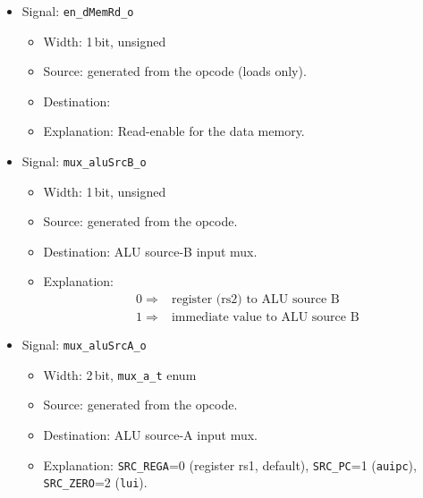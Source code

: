 \begin{itemize}
\begin{itemize}
    \item Width: 1\,bit, unsigned
    \item Source: generated from the opcode (stores only).
    \item Destination:  write enable.
    \item Explanation: Write-enable for the data memory.
  \end{itemize}
  \item Signal: \texttt{en\_dMemRd\_o}
  \begin{itemize}
    \item Width: 1\,bit, unsigned
    \item Source: generated from the opcode (loads only).
    \item Destination: 
    \item Explanation: Read-enable for the data memory.
  \end{itemize}
  \item Signal: \texttt{mux\_aluSrcB\_o}
  \begin{itemize}
    \item Width: 1\,bit, unsigned
    \item Source: generated from the opcode.
    \item Destination: ALU source-B input mux.
    \item Explanation: \[ \begin{array}{ll}
                                              0 \Rightarrow & \mbox{register (rs2) to ALU source B} \\
                                              1 \Rightarrow & \mbox{immediate value to ALU source B}
                                              \end{array} \]
  \end{itemize}
  \item Signal: \texttt{mux\_aluSrcA\_o}
  \begin{itemize}
    \item Width: 2\,bit, \texttt{mux\_a\_t} enum
    \item Source: generated from the opcode.
    \item Destination: ALU source-A input mux.
    \item Explanation: \texttt{SRC\_REGA}=0 (register rs1, default),
      \texttt{SRC\_PC}=1 (\texttt{auipc}), \texttt{SRC\_ZERO}=2 (\texttt{lui}).
  \end{itemize}

\end{itemize}
